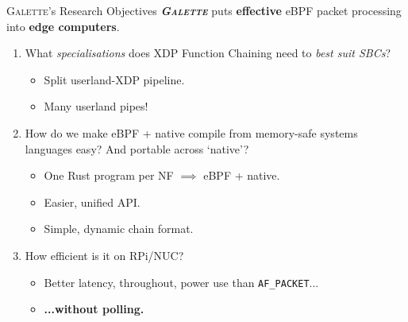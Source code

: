 \documentclass[aspectratio=169,xcolor={dvipsnames}
]{beamer}
\newcommand{\ourtech}{\textsc{Galette}}
\newcommand{\afp}{\texttt{AF\_PACKET}}
\begin{document}
\begin{frame}{\ourtech{}'s Research Objectives}
	\alert{\textbf{\emph{\ourtech{}}} puts \textbf{effective} eBPF packet processing into \textbf{edge computers}.}
	
	\begin{enumerate}
		\item What \emph{specialisations} does XDP Function Chaining need to \emph{best suit SBCs}?
		\begin{itemize}[<+->]
			\item Split userland-XDP pipeline.
			\item \alert{Many userland pipes!}
		\end{itemize}
		\item How do we make eBPF + native compile from memory-safe systems languages easy? And portable across `native'?
		\begin{itemize}[<+->]
			\item \alert{One Rust program per NF} $\implies$ eBPF + native.
			\item Easier, unified API.
			\item Simple, dynamic chain format.
		\end{itemize}
		\item How efficient is it on RPi/NUC?
		\begin{itemize}[<+->]
			\item Better latency, throughout, power use than \afp{}...
			\item \alert{\textbf{...without polling.}}
		\end{itemize}
	\end{enumerate}
%		

\end{frame}
\end{document}
